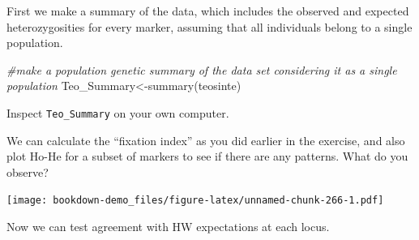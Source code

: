 \documentclass[
]{book}
\newenvironment{Shaded}{\begin{snugshade}}{\end{snugshade}}
\newcommand{\AttributeTok}[1]{\textcolor[rgb]{0.77,0.63,0.00}{#1}}
\newcommand{\CommentTok}[1]{\textcolor[rgb]{0.56,0.35,0.01}{\textit{#1}}}
\newcommand{\DecValTok}[1]{\textcolor[rgb]{0.00,0.00,0.81}{#1}}
\newcommand{\FunctionTok}[1]{\textcolor[rgb]{0.00,0.00,0.00}{#1}}
\newcommand{\NormalTok}[1]{#1}
\newcommand{\OtherTok}[1]{\textcolor[rgb]{0.56,0.35,0.01}{#1}}
\newcommand{\SpecialCharTok}[1]{\textcolor[rgb]{0.00,0.00,0.00}{#1}}
\newcommand{\StringTok}[1]{\textcolor[rgb]{0.31,0.60,0.02}{#1}}
\begin{document}
First we make a summary of the data, which includes the observed and expected heterozygosities for every marker, assuming that all individuals belong to a single population.

\begin{Shaded}
\begin{Highlighting}[]
\CommentTok{\#make a population genetic summary of the data set considering it as a single population}
\NormalTok{Teo\_Summary}\OtherTok{\textless{}{-}}\FunctionTok{summary}\NormalTok{(teosinte)}
\end{Highlighting}
\end{Shaded}

Inspect \texttt{Teo\_Summary} on your own computer.

We can calculate the ``fixation index'' as you did earlier in the exercise, and also plot Ho-He for a subset of markers to see if there are any patterns. What do you observe?

\begin{Shaded}
\end{Shaded}

\texttt{[image: bookdown-demo\_files/figure-latex/unnamed-chunk-266-1.pdf]}

\begin{Shaded}
\end{Shaded}

Now we can test agreement with HW expectations at each locus.
\end{document}
